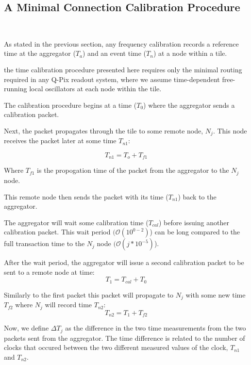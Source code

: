 \subsection{A Minimal Connection Calibration Procedure}~\label{sec:min_calib}

As stated in the previous section, any frequency calibration records a reference time at the aggregator ($T_{a}$) and an event time ($T_{n}$) at a node within a tile.

the time calibration procedure presented here requires only the minimal routing required in any Q-Pix readout system, where we assume time-dependent free-running local oscillators at each node within the tile.

The calibration procedure begins at a time ($T_{0}$) where the aggregator sends a calibration packet.

Next, the packet propagates through the tile to some remote node, $N_{j}$.
This node receives the packet later at some time $T_{n1}$:

\begin{equation}
  T_{n1} = T_{o} + T_{f1}
\end{equation}

Where $T_{f1}$ is the propogation time of the packet from the aggregator to the $N_{j}$ node.

This remote node then sends the packet with its time ($T_{n1}$) back to the aggregator.

The aggregator will wait some calibration time ($T_{cal}$) before issuing another calibration packet.
This wait period $(\mathcal{O}(10^{0-2})$) can be long compared to the full transaction time to the $N_{j}$ node $(\mathcal{O}(j*10^{-5})$).

After the wait period, the aggregator will issue a second calibration packet to be sent to a remote node at time:
\begin{equation}
  T_{1} = T_{cal} + T_{0}
\end{equation}

Similarly to the first packet this packet will propagate to $N_{j}$ with some new time $T_{f2}$ where $N_{j}$ will record time $T_{n2}$:
\begin{equation}
  T_{n2} = T_{1} + T_{f2}
\end{equation}

Now, we define $\Delta T_{j}$ as the difference in the two time measurements from the two packets sent from the aggregator.
The time difference is related to the number of clocks that occured between the two different measured values of the clock, $T_{n1}$ and $T_{n2}$.

